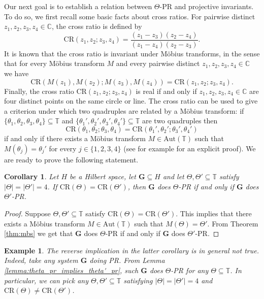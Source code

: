 \documentclass[reqno,a4paper,11pt]{amsart}
\numberwithin{equation}{section}
\newtheorem{corollary}[definition]{Corollary}
\newtheorem{example}[definition]{Example}
\def\T{{\mathbb T}}
\def\C{{\mathbb C}}
\newcommand\1{\mathds{1}}
\newcommand{\cratio}{{\mathrm{CR}}}
\begin{document}
Our next goal is to establish a relation between $\Theta$-PR and projective invariants. To do so, we first recall some basic facts about cross ratios. For pairwise distinct $z_1,z_2,z_3,z_4 \in \C$, the cross ratio is defined by
$$
\cratio(z_1,z_2;z_3,z_4) = \frac{(z_1-z_3)(z_2-z_4)}{(z_1-z_4)(z_2-z_3)}.
$$
It is known that the cross ratio is invariant under Möbius transforms, in the sense that for every Möbius transform $M$ and every pairwise distinct $z_1,z_2,z_3,z_4 \in \C$ we have
$$
\cratio(M(z_1),M(z_2);M(z_3),M(z_4)) = \cratio(z_1,z_2;z_3,z_4).
$$
Finally, the cross ratio $\cratio(z_1,z_2;z_3,z_4)$ is real if and only if $z_1,z_2,z_3,z_4 \in \C$ are four distinct points on the same circle or line. The cross ratio can be used to give a criterion under which two quadruples are related by a Möbius transform: if $\{ \theta_1,\theta_2,\theta_3,\theta_4\} \subseteq \T$ and $\{ \theta_1',\theta_2',\theta_3',\theta_4'\} \subseteq \T$ are two quadruples then $$\cratio(\theta_1,\theta_2;\theta_3,\theta_4) = \cratio(\theta_1',\theta_2';\theta_3',\theta_4')$$ if and only if there exists a Möbius transform $M\in \text{Aut}(\T)$ such that $M(\theta_j)=\theta_j'$ for every $j \in \{ 1,2,3,4 \}$ (see for example \cite{hohl2025laplace} for an explicit proof). We are ready to prove the following statement.

\begin{corollary}\label{cor:4_pr_and_cr}
    Let $H$ be a Hilbert space, let $\mathbf{G}\subseteq H$ and let $\Theta,\Theta'\subseteq \T$ satisfy $|\Theta|=|\Theta'|=4$. If $\cratio(\Theta)=\cratio(\Theta')$, then $\mathbf{G}$ does $\Theta$-PR if and only if $\mathbf{G}$ does $\Theta'$-PR. 
\end{corollary}
\begin{proof}
    Suppose $\Theta,\Theta'\subseteq \T$ satisfy $\cratio(\Theta)=\cratio(\Theta')$. This implies that there exists a Möbius transform $M\in\text{Aut}(\T)$ such that $M(\Theta)=\Theta'$. From Theorem \ref{thm:mbs} we get that $\mathbf{G}$ does $\Theta$-PR if and only if $\mathbf{G}$ does $\Theta'$-PR.
\end{proof}

\begin{example}
    The reverse implication in the latter corollary is in general not true. Indeed, take any system $\mathbf{G}$ doing PR. From Lemma \ref{lemma:theta_pr_implies_theta'_pr}, such $\mathbf{G}$ does $\Theta$-PR for any $\Theta\subseteq \T$. In particular, we can pick any $\Theta,\Theta'\subseteq \T$ satisfying $|\Theta|=|\Theta'|=4$ and $\cratio(\Theta)\neq\cratio(\Theta')$.
\end{example}
\end{document}
